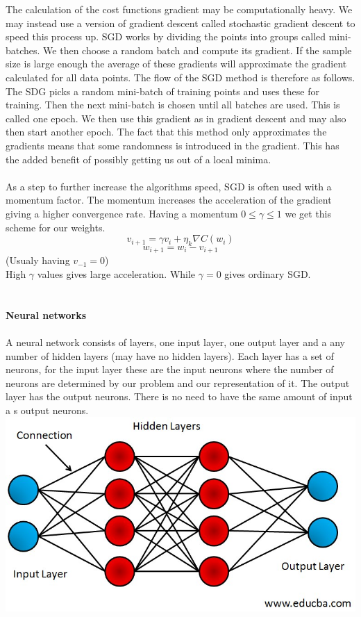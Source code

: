 \documentclass[12pt, letterpaper, twoside]{article}
\begin{document}
The calculation of the cost functions gradient may be computationally heavy. We may instead use a version of gradient descent called stochastic gradient descent to speed this process up. SGD works by dividing the points into groups called mini-batches. We then choose a random batch and compute its gradient. If the sample size is large enough the average of these gradients will approximate the gradient calculated for all data points. The flow of the SGD method is therefore as follows. The SDG picks a random mini-batch of training points and uses these for training. Then the next mini-batch is chosen until all batches are used. This is called one epoch. We then use this gradient as in gradient descent and may also then start another epoch. The fact that this method only approximates the gradients means that some randomness is introduced in the gradient. This has the added benefit of possibly getting us out of a local minima.\\
\ \\
As a step to further increase the algorithms speed, SGD is often used with a momentum factor. The momentum increases the acceleration of the gradient giving a higher convergence rate. Having a momentum $0 \leq \gamma \leq 1$ we get this scheme for our weights.
$$
v_{i+1} = \gamma v_i + \eta_k \nabla C(w_i)
$$
$$
w_{i+1} = w_i - v_{i+1}
$$
(Usualy having $v_{-1} = 0$)\\
High $\gamma$ values gives large acceleration. While $\gamma = 0$ gives ordinary SGD.\\
\ \\
\ \\
\textbf{Neural networks}\\
\ \\
A neural network consists of layers, one input layer, one output layer and a any number of hidden layers (may have no hidden layers).
Each layer has a set of neurons, for the input layer these are the input neurons where the number of neurons are determined by our problem and our representation of it. The output layer has the output neurons. There is no need to have the same amount of input a s output neurons.\\
\includegraphics[scale=0.5]{"NN"}\\
\end{document}
